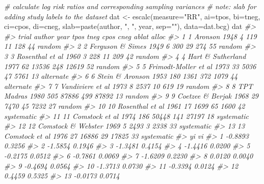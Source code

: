 \documentclass[
]{book}
\newenvironment{Shaded}{\begin{snugshade}}{\end{snugshade}}
\newcommand{\AttributeTok}[1]{\textcolor[rgb]{0.77,0.63,0.00}{#1}}
\newcommand{\CommentTok}[1]{\textcolor[rgb]{0.56,0.35,0.01}{\textit{#1}}}
\newcommand{\FunctionTok}[1]{\textcolor[rgb]{0.00,0.00,0.00}{#1}}
\newcommand{\NormalTok}[1]{#1}
\newcommand{\OtherTok}[1]{\textcolor[rgb]{0.56,0.35,0.01}{#1}}
\newcommand{\StringTok}[1]{\textcolor[rgb]{0.31,0.60,0.02}{#1}}
\begin{document}
\begin{Shaded}
\begin{Highlighting}[]
\CommentTok{\# calculate log risk ratios and corresponding sampling variances}
\CommentTok{\# note: slab for adding \textquotesingle{}study labels\textquotesingle{} to the dataset}
\NormalTok{dat }\OtherTok{\textless{}{-}} \FunctionTok{escalc}\NormalTok{(}\AttributeTok{measure=}\StringTok{"RR"}\NormalTok{, }\AttributeTok{ai=}\NormalTok{tpos, }\AttributeTok{bi=}\NormalTok{tneg,}
                            \AttributeTok{ci=}\NormalTok{cpos, }\AttributeTok{di=}\NormalTok{cneg,}
              \AttributeTok{slab=}\FunctionTok{paste}\NormalTok{(author, }\StringTok{", "}\NormalTok{, year, }\AttributeTok{sep=}\StringTok{""}\NormalTok{), }\AttributeTok{data=}\NormalTok{dat.bcg)}
\NormalTok{dat}
\CommentTok{\#\textgreater{} }
\CommentTok{\#\textgreater{}    trial               author year tpos  tneg cpos  cneg ablat      alloc }
\CommentTok{\#\textgreater{} 1      1              Aronson 1948    4   119   11   128    44     random }
\CommentTok{\#\textgreater{} 2      2     Ferguson \& Simes 1949    6   300   29   274    55     random }
\CommentTok{\#\textgreater{} 3      3      Rosenthal et al 1960    3   228   11   209    42     random }
\CommentTok{\#\textgreater{} 4      4    Hart \& Sutherland 1977   62 13536  248 12619    52     random }
\CommentTok{\#\textgreater{} 5      5 Frimodt{-}Moller et al 1973   33  5036   47  5761    13  alternate }
\CommentTok{\#\textgreater{} 6      6      Stein \& Aronson 1953  180  1361  372  1079    44  alternate }
\CommentTok{\#\textgreater{} 7      7     Vandiviere et al 1973    8  2537   10   619    19     random }
\CommentTok{\#\textgreater{} 8      8           TPT Madras 1980  505 87886  499 87892    13     random }
\CommentTok{\#\textgreater{} 9      9     Coetzee \& Berjak 1968   29  7470   45  7232    27     random }
\CommentTok{\#\textgreater{} 10    10      Rosenthal et al 1961   17  1699   65  1600    42 systematic }
\CommentTok{\#\textgreater{} 11    11       Comstock et al 1974  186 50448  141 27197    18 systematic }
\CommentTok{\#\textgreater{} 12    12   Comstock \& Webster 1969    5  2493    3  2338    33 systematic }
\CommentTok{\#\textgreater{} 13    13       Comstock et al 1976   27 16886   29 17825    33 systematic }
\CommentTok{\#\textgreater{}         yi     vi }
\CommentTok{\#\textgreater{} 1  {-}0.8893 0.3256 }
\CommentTok{\#\textgreater{} 2  {-}1.5854 0.1946 }
\CommentTok{\#\textgreater{} 3  {-}1.3481 0.4154 }
\CommentTok{\#\textgreater{} 4  {-}1.4416 0.0200 }
\CommentTok{\#\textgreater{} 5  {-}0.2175 0.0512 }
\CommentTok{\#\textgreater{} 6  {-}0.7861 0.0069 }
\CommentTok{\#\textgreater{} 7  {-}1.6209 0.2230 }
\CommentTok{\#\textgreater{} 8   0.0120 0.0040 }
\CommentTok{\#\textgreater{} 9  {-}0.4694 0.0564 }
\CommentTok{\#\textgreater{} 10 {-}1.3713 0.0730 }
\CommentTok{\#\textgreater{} 11 {-}0.3394 0.0124 }
\CommentTok{\#\textgreater{} 12  0.4459 0.5325 }
\CommentTok{\#\textgreater{} 13 {-}0.0173 0.0714}


\end{Highlighting}
\end{Shaded}
\end{document}
